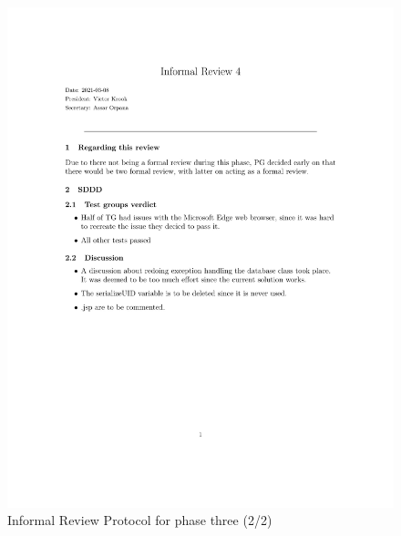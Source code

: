 \documentclass{article}
\begin{document}
  \begin{figure}
     \centering
     \includegraphics[width=13cm]{images/Phase3_2_2021_03_08-1}
     \renewcommand\figurename{Figure}
      \caption{Informal Review Protocol for phase three (2/2)}
     \label{fig:my_label}
 \end{figure}


\end{document}
